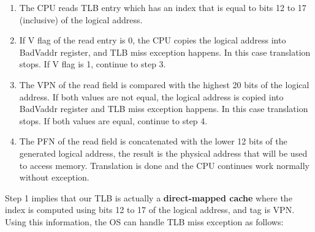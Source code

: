\documentclass[oneside]{book}
\begin{document}
\begin{enumerate}

\item The CPU reads TLB entry which has an index that is equal to
      bits 12 to 17 (inclusive) of the logical address.

\item If V flag of the read entry is 0, the CPU copies the logical
      address into BadVaddr register, and TLB miss exception happens.
      In this case translation stops. If V flag is 1, continue to
      step 3.

\item The VPN of the read field is compared with the highest 20
      bits of the logical address. If both values are not equal,
      the logical address is copied into BadVaddr register and
      TLB miss exception happens. In this case translation stops.
      If both values are equal, continue to step 4.

\item The PFN of the read field is concatenated with the lower
      12 bits of the generated logical address, the result is
      the physical address that will be used to access memory.
      Translation is done and the CPU continues work normally
      without exception.

\end{enumerate}

Step 1 implies that our TLB is actually a \textbf{direct-mapped cache}
where the index is computed using bits 12 to 17 of the logical address,
and tag is VPN. Using this information, the OS can handle TLB miss exception
as follows:
\end{document}
